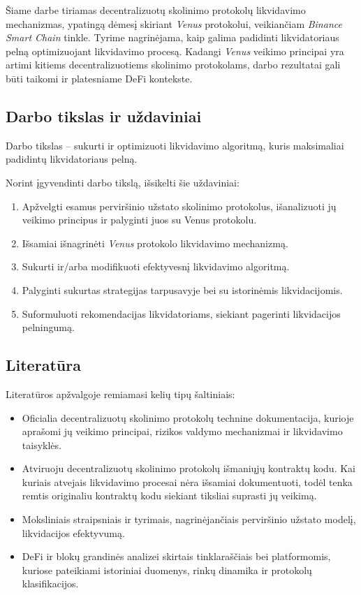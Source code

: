 \documentclass[]{VUMIFTemplateClass}
\begin{document}
Šiame darbe tiriamas decentralizuotų skolinimo protokolų likvidavimo mechanizmas, ypatingą dėmesį skiriant \textit{Venus} protokolui, veikiančiam \textit{Binance Smart Chain} tinkle. Tyrime nagrinėjama, kaip galima padidinti likvidatoriaus pelną optimizuojant likvidavimo procesą. Kadangi \textit{Venus} veikimo principai yra artimi kitiems decentralizuotiems skolinimo protokolams, darbo rezultatai gali būti taikomi ir platesniame DeFi kontekste.

\subsection*{Darbo tikslas ir uždaviniai}
Darbo tikslas – sukurti ir optimizuoti likvidavimo algoritmą, kuris maksimaliai padidintų likvidatoriaus pelną.

Norint įgyvendinti darbo tikslą, išsikelti šie uždaviniai:
\begin{enumerate}
    \item Apžvelgti esamus perviršinio užstato skolinimo protokolus, išanalizuoti jų veikimo principus ir palyginti juos su Venus protokolu.
    \item Išsamiai išnagrinėti \textit{Venus} protokolo likvidavimo mechanizmą.
    \item Sukurti ir/arba modifikuoti efektyvesnį likvidavimo algoritmą.
    \item Palyginti sukurtas strategijas tarpusavyje bei su istorinėmis likvidacijomis.
    \item Suformuluoti rekomendacijas likvidatoriams, siekiant pagerinti likvidacijos pelningumą.
\end{enumerate}

\subsection*{Literatūra}
Literatūros apžvalgoje remiamasi kelių tipų šaltiniais:
\begin{itemize}
\item Oficialia decentralizuotų skolinimo protokolų technine dokumentacija, kurioje aprašomi jų veikimo principai, rizikos valdymo mechanizmai ir likvidavimo taisyklės. \cite{aavelikvidacijos, compound-liquidation, venussavokosbendras}
\item Atviruoju decentralizuotų skolinimo protokolų išmaniųjų kontraktų kodu. Kai kuriais atvejais likvidavimo procesai nėra išsamiai dokumentuoti, todėl tenka remtis originaliu kontraktų kodu siekiant tiksliai suprasti jų veikimą. \cite{venusprotocolcode, venusmaxcf}
\item Moksliniais straipsniais ir tyrimais, nagrinėjančiais perviršinio užstato modelį, likvidacijos efektyvumą. \cite{Emp}
\item DeFi ir blokų grandinės analizei skirtais tinklaraščiais bei platformomis, kuriose pateikiami istoriniai duomenys, rinkų dinamika ir protokolų klasifikacijos. \cite{LikvidacijuProtokolai}
\end{itemize}
\end{document}
